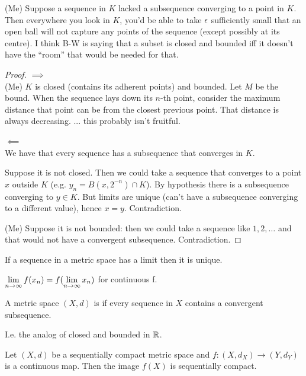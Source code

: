 \begin{intuition}
  (Me) Suppose a sequence in $K$ lacked a subsequence converging to a point in $K$. Then everywhere
  you look in $K$, you'd be able to take $\epsilon$ sufficiently small that an open ball will not
  capture any points of the sequence (except possibly at its centre). I think B-W is saying that a
  subset is closed and bounded iff it doesn't have the ``room​'' that would be needed for that.
\end{intuition}

\begin{proof}
  $\implies$\\
  (Me) $K$ is closed (contains its adherent points) and bounded. Let $M$ be the bound. When the
  sequence lays down its $n$-th point, consider the maximum distance that point can be from the
  closest previous point. That distance is always decreasing. ... this probably isn't fruitful.

  $\impliedby$\\
  We have that every sequence has a subsequence that converges in $K$.

  Suppose it is not closed. Then we could take a sequence that converges to a point $x$ outside $K$
  (e.g. $y_n = B(x, 2^{-n}) \cap K$). By hypothesis there is a subsequence converging to $y \in K$.
  But limits are unique (can't have a subsequence converging to a different value), hence $x = y$.
  Contradiction.

  (Me) Suppose it is not bounded: then we could take a sequence like $1, 2, \ldots$ and that would
  not have a convergent subsequence. Contradiction.
\end{proof}

\begin{lemma}
  If a sequence in a metric space has a limit then it is unique.
\end{lemma}

\begin{lemma}
  $\limninf f(x_n) = f(\limninf x_n)$ for continuous f.
\end{lemma}

\begin{definition}
  A metric space $(X, d)$ is  if every sequence in $X$ contains a convergent
  subsequence.
\end{definition}

I.e. the analog of closed and bounded in $\mathbb{R}$.

\begin{lemma}
  Let $(X, d)$ be a sequentially compact metric space and $f: (X, d_X) \to (Y, d_Y)$ is a
  continuous map. Then the image $f(X)$ is sequentially compact.
\end{lemma}



